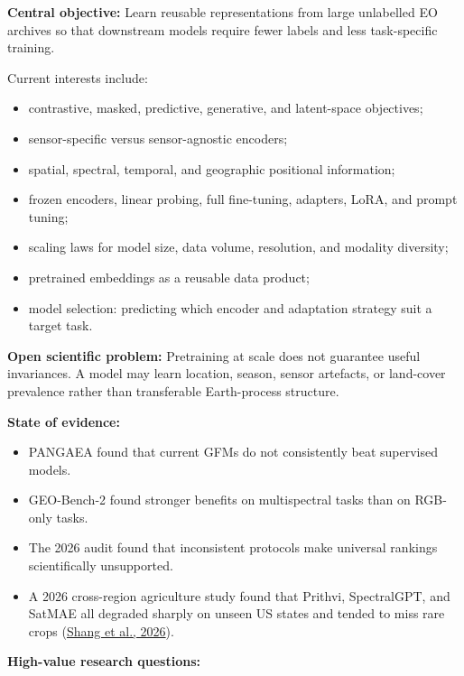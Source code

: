 \documentclass[
  a4paper,
  11pt]{article}
\providecommand{\tightlist}{%
  \setlength{\itemsep}{0pt}\setlength{\parskip}{0pt}}
\begin{document}
\textbf{Central objective:} Learn reusable representations from large
unlabelled EO archives so that downstream models require fewer labels
and less task-specific training.

Current interests include:

\begin{itemize}
\tightlist
\item
  contrastive, masked, predictive, generative, and latent-space
  objectives;
\item
  sensor-specific versus sensor-agnostic encoders;
\item
  spatial, spectral, temporal, and geographic positional information;
\item
  frozen encoders, linear probing, full fine-tuning, adapters, LoRA, and
  prompt tuning;
\item
  scaling laws for model size, data volume, resolution, and modality
  diversity;
\item
  pretrained embeddings as a reusable data product;
\item
  model selection: predicting which encoder and adaptation strategy suit
  a target task.
\end{itemize}

\textbf{Open scientific problem:} Pretraining at scale does not
guarantee useful invariances. A model may learn location, season, sensor
artefacts, or land-cover prevalence rather than transferable
Earth-process structure.

\textbf{State of evidence:}

\begin{itemize}
\tightlist
\item
  PANGAEA found that current GFMs do not consistently beat supervised
  models.
\item
  GEO-Bench-2 found stronger benefits on multispectral tasks than on
  RGB-only tasks.
\item
  The 2026 audit found that inconsistent protocols make universal
  rankings scientifically unsupported.
\item
  A 2026 cross-region agriculture study found that Prithvi, SpectralGPT,
  and SatMAE all degraded sharply on unseen US states and tended to miss
  rare crops (\href{https://arxiv.org/abs/2606.29664}{Shang et al.,
  2026}).
\end{itemize}

\textbf{High-value research questions:}
\end{document}
